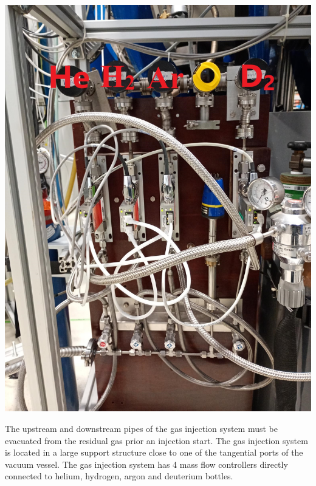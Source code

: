 \documentclass[fleqn,a4paper,20pt]{article}
\begin{document}
\begin{minipage}{.3\textwidth}
	\centering
	\includegraphics[width=\linewidth]{Gas1}
\end{minipage}
\begin{minipage}{.02\textwidth}
\end{minipage}
\begin{minipage}{.68\textwidth}
The upstream and downstream pipes of the gas injection system must be evacuated from the residual gas prior an injection start. The gas injection system is located in a large support structure close to one of the tangential ports of the vacuum vessel. The gas injection system has 4 mass flow controllers directly connected to helium, hydrogen, argon and deuterium bottles. 
\end{minipage}	
	
\end{document}

